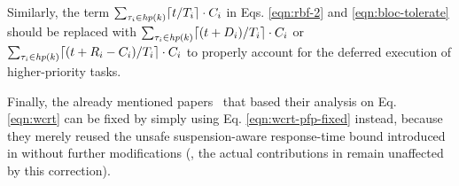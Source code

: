 Similarly, the term $\sum_{\tau_i \in \mathit{hp}(k)} \lceil t / T_i \rceil \cdot C_i$ in Eqs. \eqref{eqn:rbf-2} and \eqref{eqn:bloc-tolerate} should be replaced with $\sum_{\tau_i \in \mathit{hp}(k)} \lceil (t+D_i) / T_i \rceil \cdot C_i$ or $\sum_{\tau_i \in \mathit{hp}(k)} \lceil (t+R_i-C_i) / T_i \rceil \cdot C_i$ to properly account for the deferred execution of higher-priority tasks.

Finally, the already mentioned papers~\cite{zeng-2011,bbb-2013,yang-2013,kim-2014,han-2014,carminati-2014,yang-2014} that based their analysis on Eq. \eqref{eqn:wcrt} can be fixed by simply using Eq. \eqref{eqn:wcrt-pfp-fixed} instead, because they merely reused the unsafe suspension-aware response-time bound introduced in \cite{lakshmanan-2009} without further modifications (\ie, the actual contributions in \cite{zeng-2011,bbb-2013,yang-2013,kim-2014,han-2014,carminati-2014,yang-2014} remain unaffected by this correction).
  
  




  